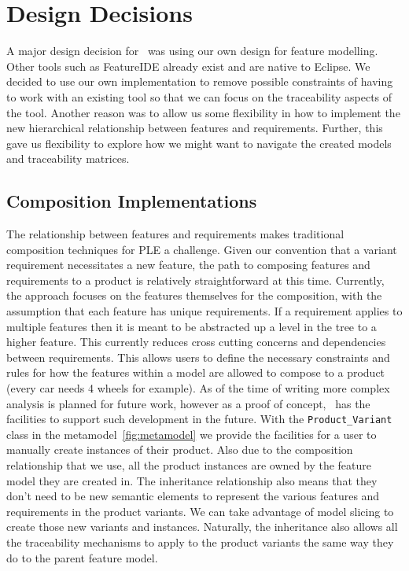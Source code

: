 \section{Design Decisions}

A major design decision for \tool\ was using our own design for feature modelling. Other tools such as FeatureIDE already exist and are native to Eclipse. We decided to use our own implementation to remove possible constraints of having to work with an existing tool so that we can focus on the traceability aspects of the tool. Another reason was to allow us some flexibility in how to implement the new hierarchical relationship between features and requirements. Further, this gave us flexibility to explore how we might want to navigate the created models and traceability matrices. 

\subsection{Composition Implementations}

The relationship between features and requirements makes traditional composition techniques for \ac{PLE} a challenge. Given our convention that a variant requirement necessitates a new feature, the path to composing features and requirements to a product is relatively straightforward at this time. Currently, the approach focuses on the features themselves for the composition, with the assumption that each feature has unique requirements. If a requirement applies to multiple features then it is meant to be abstracted up a level in the tree to a higher feature. This currently reduces cross cutting concerns and dependencies between requirements. This allows users to define the necessary constraints and rules for how the features within a model are allowed to compose to a product (every car needs 4 wheels for example). As of the time of writing more complex analysis is planned for future work, however as a proof of concept, \tool\ has the facilities to support such development in the future. With the \texttt{Product\_Variant} class in the metamodel~\ref{fig:metamodel} we provide the facilities for a user to manually create instances of their product. Also due to the composition relationship that we use, all the product instances are owned by the feature model they are created in. The inheritance relationship also means that they don't need to be new semantic elements to represent the various features and requirements in the product variants. We can take advantage of model slicing to create those new variants and instances. Naturally, the inheritance also allows all the traceability mechanisms to apply to the product variants the same way they do to the parent feature model.

